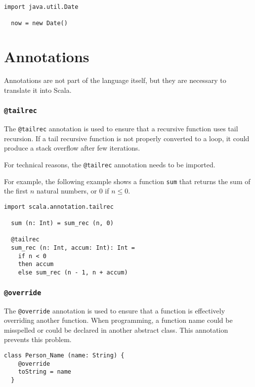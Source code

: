 \documentclass[12pt,a4paper]{book}
\makeatletter
\newcommand{\srccode}[1]{\texttt{{#1}}}
\newcommand{\annotation}[1]{{\color{brown}\srccode{#1}}\xspace}
\newcommand{\stailrec}{\annotation{@tailrec}}
\newcommand{\soverride}{\annotation{@override}}
\makeatother
\begin{document}
    \begin{lstlisting}[label={lst:exampleImportDate}]
  import java.util.Date

  now = new Date()
    \end{lstlisting}


    \section{Annotations}

    Annotations are not part of the language itself, but they are necessary to translate it into Scala.

    \subsubsection{\stailrec}

    The \stailrec annotation is used to ensure that a recursive function uses tail recursion.
    If a tail recursive function is not properly converted to a loop, it could produce a stack overflow after few iterations.

    For technical reasons, the \stailrec annotation needs to be imported.

    For example, the following example shows a function \srccode{sum} that returns the sum of the first $n$ natural numbers, or 0 if $n \leq 0$.

    \begin{lstlisting}[label={lst:exampleTailrec}]
  import scala.annotation.tailrec

  sum (n: Int) = sum_rec (n, 0)

  @tailrec
  sum_rec (n: Int, accum: Int): Int =
    if n < 0
    then accum
    else sum_rec (n - 1, n + accum)

    \end{lstlisting}

    \subsubsection{\soverride}

    The \soverride annotation is used to ensure that a function is effectively overriding another function.
    When programming, a function name could be misspelled or could be declared in another abstract class.
    This annotation prevents this problem.

    \begin{lstlisting}[label={lst:exampleOverride}]
  class Person_Name (name: String) {
    @override
    toString = name
  }
    \end{lstlisting}
\end{document}
